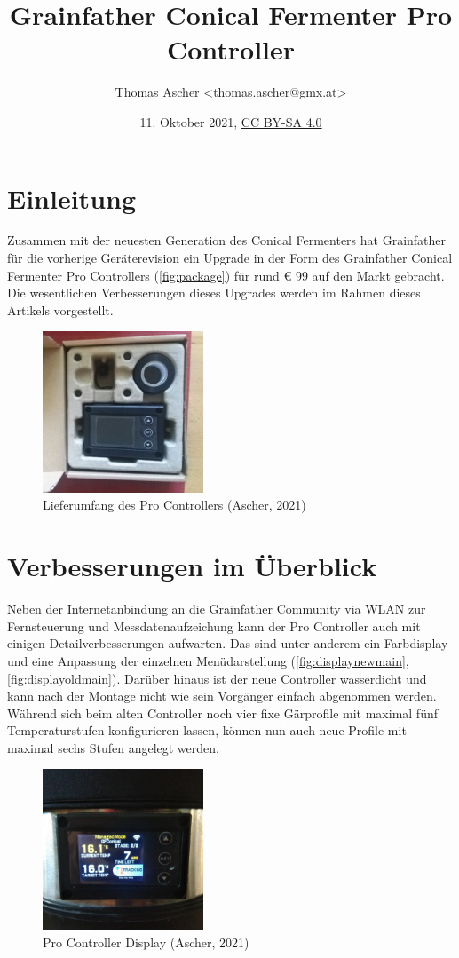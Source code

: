 \documentclass[a4paper,parskip=half]{scrartcl}
\title{Grainfather Conical Fermenter Pro Controller}
\author{Thomas Ascher <thomas.ascher@gmx.at>}
\date{11. Oktober 2021, \href{http://creativecommons.org/licenses/by-sa/4.0/}{CC BY-SA 4.0}}
\begin{document}
\maketitle

\section*{Einleitung}

Zusammen mit der neuesten Generation des Conical Fermenters
hat Grainfather für die vorherige Geräterevision ein Upgrade
in der Form des Grainfather Conical Fermenter Pro Controllers (\autoref{fig:package}) für rund € 99 auf den Markt gebracht.
Die wesentlichen Verbesserungen dieses Upgrades werden im Rahmen
dieses Artikels vorgestellt. 
 
\begin{figure}[h]
\centering
\includegraphics[width=4.8cm]{images/gfpc_package.jpg}
\caption{Lieferumfang des Pro Controllers (Ascher, 2021)}
\label{fig:package}
\end{figure}

\section*{Verbesserungen im Überblick}

Neben der Internetanbindung an die Grainfather Community
via WLAN zur Fernsteuerung und Messdatenaufzeichung kann der
Pro Controller auch mit einigen Detailverbesserungen aufwarten.
Das sind unter anderem ein Farbdisplay und eine Anpassung
der einzelnen Menüdarstellung (\autoref{fig:displaynewmain},
\autoref{fig:displayoldmain}). Darüber hinaus ist der neue
Controller wasserdicht und kann nach der Montage nicht
wie sein Vorgänger einfach abgenommen werden.
Während sich beim alten Controller noch vier fixe Gärprofile mit
maximal fünf Temperaturstufen konfigurieren lassen, können nun
auch neue Profile mit maximal sechs Stufen angelegt werden.

\begin{figure}[H]
\centering
\includegraphics[width=4.8cm]{images/gfpc_display_new_main.jpg}
\caption{Pro Controller Display (Ascher, 2021)}
\label{fig:displaynewmain}
\end{figure}
\end{document}
